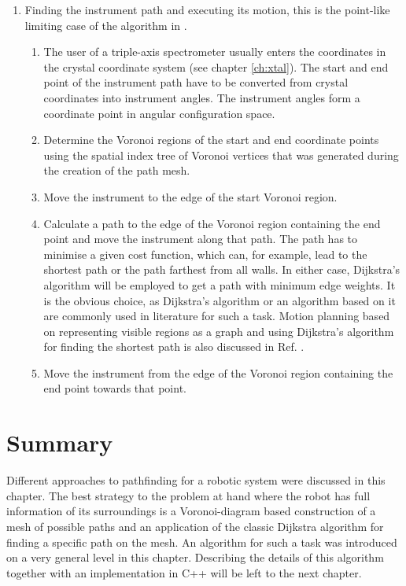 \begin{enumerate}
	\item Finding the instrument path and executing its motion, this is the 
		point-like limiting case of the algorithm in \cite[p. 163]{Berg2008}.
	\begin{enumerate}
		\item The user of a triple-axis spectrometer usually enters the coordinates 
			in the crystal coordinate system (see chapter \ref{ch:xtal}). The start 
			and end point of the instrument path have to be converted from crystal
			coordinates into instrument angles. The instrument angles form a 
			coordinate point in angular configuration space.
		\item Determine the Voronoi regions of the start and end coordinate points
			using the spatial index tree of Voronoi vertices that was generated 
			during the creation of the path mesh.
		\item Move the instrument to the edge of the start Voronoi region.
		\item Calculate a path to the edge of the Voronoi region 
			containing the end point and move the instrument along that path. 
			The path has to minimise a given cost function, which can,
			for example, lead to the shortest path or the path farthest from
			all walls. 
			In either case, Dijkstra's algorithm \cite{wiki_dijkstra}
			will be employed to get a path with minimum edge weights.
			It is the obvious choice, as Dijkstra's algorithm or an algorithm based 
			on it are commonly used in literature \cite{Hwang2003, Singal2014} 
			for such a task. Motion planning based on representing visible regions
			as a graph and using Dijkstra's algorithm for finding the shortest path
			is also discussed in Ref. \cite[Ch. 7, p. 313]{FUH_geo2020}.
		\item Move the instrument from the edge of the Voronoi region containing 
			the end point towards that point.
	\end{enumerate}
\end{enumerate}


\section{Summary}
Different approaches to pathfinding for a robotic system were discussed in this chapter.
The best strategy to the problem at hand where the robot has full information of its
surroundings is a Voronoi-diagram based construction of a mesh of possible paths and 
an application of the classic Dijkstra algorithm for finding a specific path on the mesh.
An algorithm for such a task was introduced on a very general level in this chapter.
Describing the details of this algorithm together with an implementation in C++  
will be left to the next chapter.
